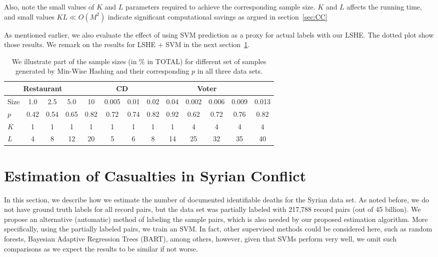\documentclass[aoas]{imsart}
\begin{document}
Also, note the small values of $K$ and $L$ parameters required to achieve the corresponding sample size. $K$ and $L$ affects the running time, and small values $KL \ll O(M^2)$ indicate significant computational savings as argued in section~\ref{sec:CC}

As mentioned earlier, we also evaluate the effect of using SVM prediction as a proxy for actual labels with our LSHE. The dotted plot show those results. We remark on the results for LSHE + SVM in the next section~\ref{syria}.

\begin{table}[ht]
	\centering
	\setlength\tabcolsep{0.18cm}
		\begin{tabular}{l|cccc|cccc|cccc}
			\toprule
			\multicolumn{4}{c}{\textbf{Restaurant}}&\multicolumn{4}{c}{\textbf{CD}}&\multicolumn{4}{c}{\textbf{Voter}}
			\\
			\midrule
			Size&1.0&2.5&5.0&10&0.005 & 0.01& 0.02 & 0.04&0.002&0.006&0.009&0.013
			\\
			
			$p$&0.42&0.54&0.65&0.82& 0.72& 0.74& 0.82& 0.92& 0.62&0.72& 0.76& 0.82
			\\
			
			$K$&1&1&1&1& 1& 1& 1& 1& 4& 4& 4& 4
			\\						
			
			$L$& 4 & 8 &12&20& 5& 6 & 8 & 14 &  25&  32&  35&40
			\\

			\bottomrule			
		\end{tabular}
			\caption{ We illustrate part of the sample sizes (in \% in TOTAL) for different set of samples generated by Min-Wise Hashing and their corresponding $p$ in all three data sets. }
			\label{table2}
\end{table}




\section{Estimation of Casualties in Syrian Conflict}
\label{syria}
In this section, we describe how we estimate the number of documented identifiable deaths for the Syrian data set. As noted before, we do not have ground truth labels for all record pairs, but the data set was partially labeled with 217,788 record pairs (out of 45 billion). We propose an alternative (automatic) method of labeling the sample pairs, which is also needed by our proposed estimation algorithm. More specifically, using the partially labeled pairs, we train an SVM. In fact, other supervised methods could be considered here, such as random forests, Bayesian Adaptive Regression Trees (BART), among others, however, given that SVMs perform very well, we omit such comparisons as we expect the results to be similar if not worse.
\end{document}
